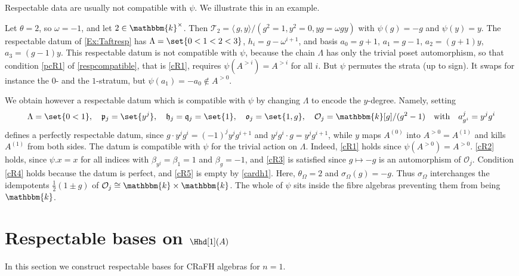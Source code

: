 \documentclass[a4paper,11pt]{amsart}
\let\<\langle
\let\>\rangle
\numberwithin{equation}{subsection}
\theoremstyle{definition}
\theoremstyle{theorem}
\theoremstyle{remark}
\newcommand\CO{\mathcal{O}}
\newcommand\plam[1][\lambda]{\mathfrak{p}_{#1}}
\newcommand\hlam[1][\lambda]{\mathfrak{h}_{#1}}
\newcommand\qlam[1][\lambda]{\mathfrak{q}_{#1}}
\newcommand\Olam[1][\lambda]{\CO_{#1}}
\newcommand\olam[1][\lambda]{\mathfrak{o}_{#1}}
\newcommand\Taft[1][\theta]{\mathscr{T}_{#1}}
\newcommand\kk{\mathbbm{k}}
\begin{document}
Respectable data are usually not compatible with $\psi$. We illustrate this in an example.
\begin{Example}\label{Ex:T2compatible}
  Let $\theta=2$, so $\omega=-1$, and let $2\in\kk^{\times}$.  Then
  $\Taft[2]=\<\,g,y\>/(g^{2}=1, y^{2}=0, yg=\omega gy)$ with $\psi(g)=-g$
  and $\psi(y)=y$.  The respectable datum of \autoref{Ex:Taftresp} has
  $\Lambda=\set{0<1<2<3}$, $h_i=g-\omega^{i+1}$, and basis $a_0=g+1$,
  $a_1=g-1$, $a_2=(g+1)y$, $a_3=(g-1)y$. This respectable datum  is not compatible with $\psi$, because the chain $\Lambda$ has only the trivial poset automorphism,
  so that condition \autoref{pcR1} of \autoref{respcompatible}, that is
  \autoref{cR1}, requires
  $\psi(A^{>i})=A^{>i}$ for all $i$. But $\psi$ permutes the strata (up to
  sign). It swaps for instance the $0$- and the $1$-stratum, but
  $\psi(a_1)=-a_0\notin A^{>0}$.

We obtain however a respectable datum which is compatible with $\psi$ by changing $\Lambda$ to encode the $y$-degree. Namely, setting
\[\Lambda=\set{0<1}, \quad \plam[j]=\set{y^{j}},\quad
  \hlam[j]=\qlam[j]=\set{1},\quad \olam[j]=\set{1,g},\quad \Olam[j]=\kk[g]/(g^{2}-1)\quad\text{with}\quad a_{g^{i}}^{j}=y^{j}g^{i}
  \]
   defines a perfectly respectable
  datum, since $g\cdot y^{j}g^{i}=(-1)^{j}y^{j}g^{i+1}$ and
  $y^{j}g^{i}\cdot g=y^{j}g^{i+1}$, while $y$ maps $A^{(0)}$ into
  $A^{>0}=A^{(1)}$ and kills $A^{(1)}$ from both sides.  The datum is
  compatible with $\psi$ for the trivial action on $\Lambda$. Indeed,
  \autoref{cR1} holds since $\psi(A^{>0})=A^{>0}$.  \autoref{cR2} holds, since $\psi.x=x$ for all indices with $\beta_{y^{j}}=\beta_{1}=1$ and $\beta_{g}=-1$, and \autoref{cR3} is satisfied since $g\mapsto-g$ is an automorphism of $\Olam[j]$.
 Condition \autoref{cR4} holds because
  the datum is perfect, and \autoref{cR5} is empty by
  \autoref{cardh1}.  Here, $\theta_\Omega=2$ and
  $\sigma_\Omega(g)=-g$.  Thus  $\sigma_\Omega$  interchanges the idempotents
  $\tfrac12(1\pm g)$ of $\Olam[j]\cong\kk\times\kk$. The whole of $\psi$ sits
  inside the fibre algebras preventing them from being  $\kk$.
\end{Example}



\section{Respectable bases on $\Hhd[1](A)$}
In this section we construct respectable bases for CRaFH algebras for $n=1$.
\end{document}
